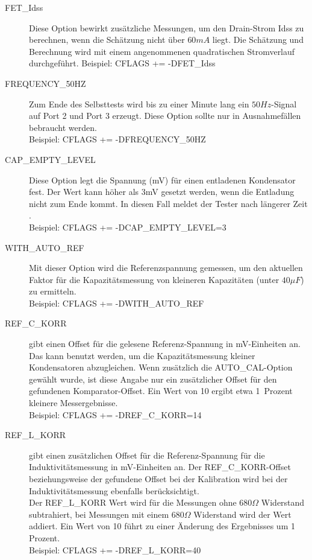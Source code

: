\begin{description}
 \item[FET\_Idss]
Diese Option bewirkt zusätzliche Messungen, um den Drain-Strom Idss zu berechnen, wenn die Schätzung nicht
über \(60mA\) liegt. Die Schätzung und Berechnung wird mit einem angenommenen quadratischen Stromverlauf durchgeführt.
Beispiel: CFLAGS += -DFET\_Idss

  \item[FREQUENCY\_50HZ] Zum Ende des Selbsttests wird bis zu einer Minute lang ein \(50Hz\)-Signal auf Port 2 und Port 3 erzeugt.
Diese Option sollte nur in Ausnahmefällen bebraucht werden.\\
Beispiel: CFLAGS += -DFREQUENCY\_50HZ

  \item[CAP\_EMPTY\_LEVEL] Diese Option legt die Spannung (mV) für einen entladenen Kondensator fest.
  Der Wert kann höher als 3mV gesetzt werden, wenn die Entladung nicht zum Ende kommt. In diesen Fall meldet der Tester nach längerer Zeit .\\
Beispiel: CFLAGS += -DCAP\_EMPTY\_LEVEL=3

  \item[WITH\_AUTO\_REF] Mit dieser Option wird die Referenzspannung gemessen, um den aktuellen Faktor für die Kapazitätsmessung 
von kleineren Kapazitäten (unter \(40\mu F\)) zu ermitteln.\\
Beispiel: CFLAGS += -DWITH\_AUTO\_REF

  \item[REF\_C\_KORR] gibt einen Offset für die gelesene Referenz-Spannung in mV-Einheiten an.
Das kann benutzt werden, um die Kapazitätsmessung kleiner Kondensatoren abzugleichen.
Wenn zusätzlich die AUTO\_CAL-Option gewählt wurde, ist diese Angabe nur ein zusätzlicher Offset für
den gefundenen Komparator-Offset.
Ein Wert von 10 ergibt etwa 1~Prozent kleinere Messergebnisse.\\
Beispiel: CFLAGS += -DREF\_C\_KORR=14

  \item[REF\_L\_KORR] gibt einen zusätzlichen Offset für die Referenz-Spannung für die Induktivitätsmessung
in mV-Einheiten an. Der REF\_C\_KORR-Offset beziehungsweise der gefundene Offset bei der Kalibration
wird bei der Induktivitätsmessung ebenfalls berücksichtigt.\\
Der REF\_L\_KORR Wert wird für die Messungen ohne \(680\Omega\) Widerstand subtrahiert, bei Messungen mit einem
\(680\Omega\) Widerstand wird der Wert addiert.
Ein Wert von 10 führt zu einer Änderung des Ergebnisses um 1 Prozent.\\
Beispiel: CFLAGS += -DREF\_L\_KORR=40


\end{description}
